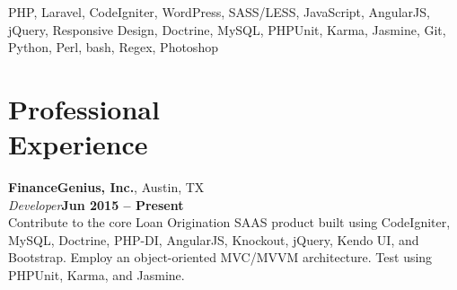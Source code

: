 \documentclass[margin,line]{resume}
\begin{document}
\begin{resume}

PHP, Laravel, CodeIgniter, WordPress, SASS/LESS, JavaScript, AngularJS, jQuery, Responsive Design, Doctrine, MySQL, PHPUnit, Karma, Jasmine, Git, Python, Perl, bash, Regex, Photoshop







\section{\mysidestyle Professional\\Experience}

\textbf{FinanceGenius, Inc.}, Austin, TX
\vspace{2mm}\\
\textsl{Developer}\hfill \textbf{Jun 2015 -- Present}\vspace{1mm}\\
Contribute to the core Loan Origination SAAS product built using CodeIgniter, MySQL, Doctrine, PHP-DI, AngularJS, Knockout, jQuery, Kendo UI, and Bootstrap. Employ an object-oriented MVC/MVVM architecture. Test using PHPUnit, Karma, and Jasmine.\vspace{1mm}



\end{resume}
\end{document}

